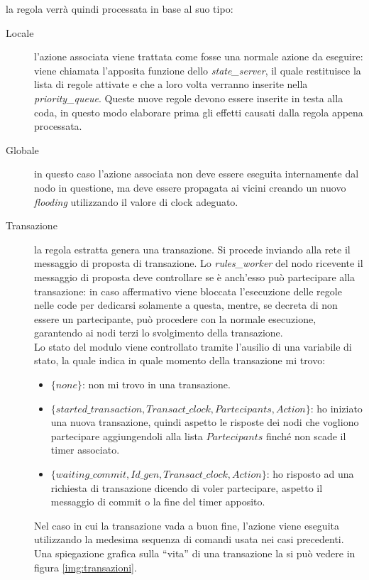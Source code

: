 \documentclass[italian]{memoir}
\begin{document}
la regola verrà quindi processata in base al suo tipo:
\begin{description}
\item[Locale] l'azione associata viene trattata come fosse una normale azione da eseguire: viene chiamata l'apposita funzione dello \textit{state\_server}, il quale restituisce la lista di regole attivate e che a loro volta verranno inserite nella \textit{priority\_queue}. Queste nuove regole devono essere inserite in testa alla coda, in questo modo elaborare prima gli effetti causati dalla regola appena processata.
\item[Globale] in questo caso l'azione associata non deve essere eseguita internamente dal nodo in questione, ma deve essere propagata ai vicini creando un nuovo \textit{flooding} utilizzando il valore di clock adeguato.
\item[Transazione] la regola estratta genera una transazione. Si procede inviando alla rete il messaggio di proposta di transazione. Lo \textit{rules\_worker} del nodo ricevente il messaggio di proposta deve controllare se è anch'esso può partecipare alla transazione: in caso affermativo viene bloccata l'esecuzione delle regole nelle code per dedicarsi solamente a questa, mentre, se decreta di non essere un partecipante, può procedere con la normale esecuzione, garantendo ai nodi terzi lo svolgimento della transazione.\\
Lo stato del modulo viene controllato tramite l'ausilio di una variabile di stato, la quale indica in quale momento della transazione mi trovo:
\begin{itemize}
\item $\{none\}$: non mi trovo in una transazione.
\item $\{started\_transaction, Transact\_clock, Partecipants, Action\}$: ho iniziato una nuova transazione, quindi aspetto le risposte dei nodi che vogliono partecipare aggiungendoli alla lista $Partecipants$ finché non scade il timer associato.
\item $\{waiting\_commit, Id\_gen, Transact\_clock, Action\}$: ho risposto ad una richiesta di transazione dicendo di voler partecipare, aspetto il messaggio di commit o la fine del timer apposito.
\end{itemize}

Nel caso in cui la transazione vada a buon fine, l'azione viene eseguita utilizzando la medesima sequenza di comandi usata nei casi precedenti. Una spiegazione grafica sulla ``vita'' di una transazione la si può vedere in figura \ref{img:transazioni}.

\end{description}
\end{document}
